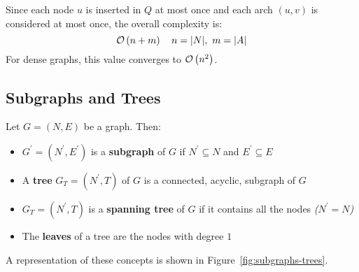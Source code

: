 \documentclass[english]{article}
\begin{document}
Since each node \(u\) is inserted in \(Q\) at most once and each arch \((u,v)\) is considered at most once, the overall complexity is:
\[ \mathcal{O}\left(n+m\right) \quad n = |N|, \ m =|A|\]
For dense graphs, this value converges to \(\mathcal{O}\left(n^2\right)\).

\subsection{Subgraphs and Trees}

Let \(G = (N, E)\) be a graph.
Then:

\begin{itemize}
  \item \(G^\prime = (N^\prime, E^\prime)\) is a \textbf{subgraph} of \(G\) if \(N^\prime \subseteq N\) and \(E^\prime \subseteq E\)
  \item A \textbf{tree} \(G_T = (N^\prime, T)\) of \(G\) is a connected, acyclic, subgraph of \(G\)
  \item \(G_T = (N^\prime, T)\) is a \textbf{spanning tree} of \(G\) if it contains all the nodes \textit{(\(N^\prime = N\))}
  \item The \textbf{leaves} of a tree are the nodes with degree \(1\)
\end{itemize}

\bigskip
A representation of these concepts is shown in Figure~\ref{fig:subgraphs-trees}.
\end{document}
